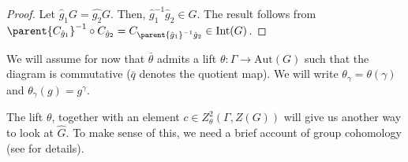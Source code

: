 \begin{proof}
    Let \(\hat{g}_1G=\hat{g_2} G\). Then, \(\hat{g}_1^{-1} \hat{g}_2 \in G\). The result follows from \(\parent{C_{\hat{g}_1}}^{-1}\circ C_{\hat{g}_2}=C_{\parent{\hat{g}_1}^{-1} \hat{g}_2}\in \mathrm{Int}(G)\).
\end{proof}
\noindent
\begin{minipage}{0.75\textwidth}
   We will assume for now that \(\bar{\theta}\) admits a lift \(\theta\colon \Gamma \to \mathrm{Aut}(G)\) such that the diagram is commutative (\(\bar{q}\) denotes the quotient map). We will write \(\theta_\gamma=\theta(\gamma)\) and \(\theta_\gamma(g)=g^\gamma\).
\end{minipage}
\begin{minipage}{0.24\textwidth}
    \begin{center}
\end{center}
\end{minipage}
The lift \(\theta\), together with an element \(c \in Z^2_\theta(\Gamma, Z(G))\) will give us another way to look at \(\hat{G}\). To make sense of this, we need a brief account of group cohomology (see \parencite[Appendix 18.3]{hilgert2011structure} for details). \\

